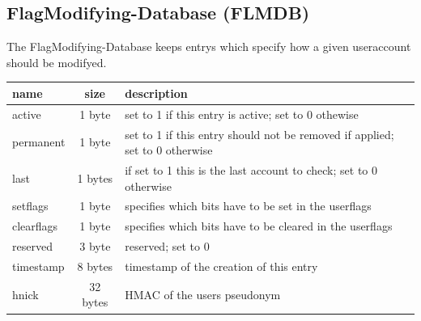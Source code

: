 \subsection{FlagModifying-Database (FLMDB)}
The FlagModifying-Database keeps entrys which specify how a given useraccount should be modifyed. \\
\begin{tabular}{|l|c|l|} \hline
name & size & description \\ \hline 
active          & 1 byte    & set to 1 if this entry is active; set to 0 othewise \\
permanent  & 1 byte & set to 1 if this entry should not be removed if applied; set to 0 otherwise \\
last             & 1 bytes & if set to 1 this is the last account to check; set to 0 otherwise \\ 
setflags       & 1 byte & specifies which bits have to be set in the userflags\\
clearflags    & 1 byte & specifies which bits have to be cleared in the userflags\\
reserved     & 3 byte & reserved; set to 0\\
timestamp  & 8 bytes & timestamp of the creation of this entry\\
hnick          & 32 bytes & HMAC of the users pseudonym\\
\hline
\end{tabular}


